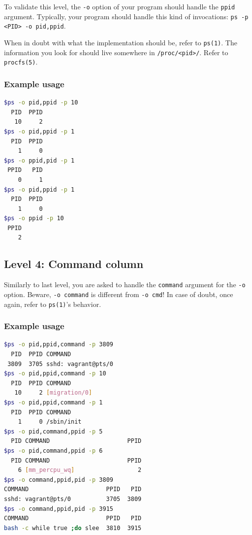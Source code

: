 \documentclass[12pt]{article}
\begin{document}
To validate this level, the \texttt{-o} option of your program should handle the \texttt{ppid} argument. Typically, your program should handle this kind of invocations: \texttt{ps -p <PID> -o pid,ppid}.

When in doubt with what the implementation should be, refer to \texttt{ps(1)}. The information you look for should live somewhere in \texttt{/proc/<pid>/}. Refer to \texttt{procfs(5)}.

\subsubsection{Example usage}

\begin{lstlisting}[language=bash]
$ps -o pid,ppid -p 10
  PID  PPID
   10     2
$ps -o pid,ppid -p 1
  PID  PPID
    1     0
$ps -o ppid,pid -p 1
 PPID   PID
    0     1
$ps -o pid,ppid -p 1
  PID  PPID
    1     0
$ps -o ppid -p 10
 PPID
    2
\end{lstlisting}

\subsection{Level 4: Command column}

Similarly to last level, you are asked to handle the \texttt{command} argument for the \texttt{-o} option. Beware, \texttt{-o command} is different from \texttt{-o cmd}! In case of doubt, once again, refer to \texttt{ps(1)}'s behavior.

\subsubsection{Example usage}

\begin{lstlisting}[language=bash]
$ps -o pid,ppid,command -p 3809
  PID  PPID COMMAND
 3809  3705 sshd: vagrant@pts/0
$ps -o pid,ppid,command -p 10
  PID  PPID COMMAND
   10     2 [migration/0]
$ps -o pid,ppid,command -p 1
  PID  PPID COMMAND
    1     0 /sbin/init
$ps -o pid,command,ppid -p 5
  PID COMMAND                      PPID
$ps -o pid,command,ppid -p 6
  PID COMMAND                      PPID
    6 [mm_percpu_wq]                  2
$ps -o command,ppid,pid -p 3809
COMMAND                      PPID   PID
sshd: vagrant@pts/0          3705  3809
$ps -o command,ppid,pid -p 3915
COMMAND                      PPID   PID
bash -c while true ;do slee  3810  3915
\end{lstlisting}
\end{document}
